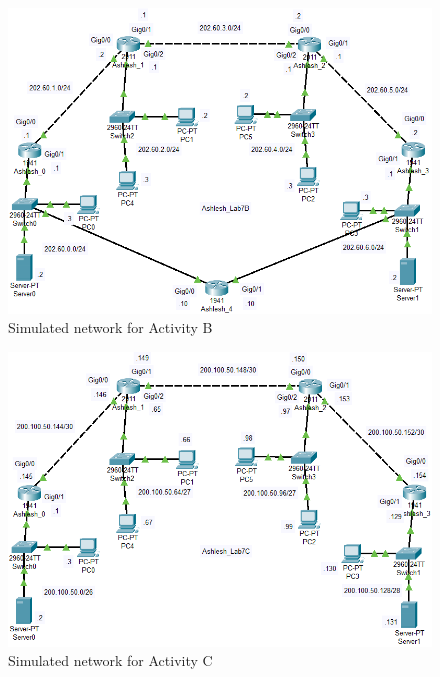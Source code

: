 \documentclass{lab_sheet}
\begin{document}
\begin{figure}[H]
	\centering
	\includegraphics[scale=.8]{Figures/activityb.png}
	\caption{Simulated network for Activity B}
	\label{fig:activityb}
\end{figure}

\begin{figure}[H]
	\centering
	\includegraphics[scale=.8]{Figures/activityc.png}
	\caption{Simulated network for Activity C}
	\label{fig:activityc}
\end{figure}
\end{document}
